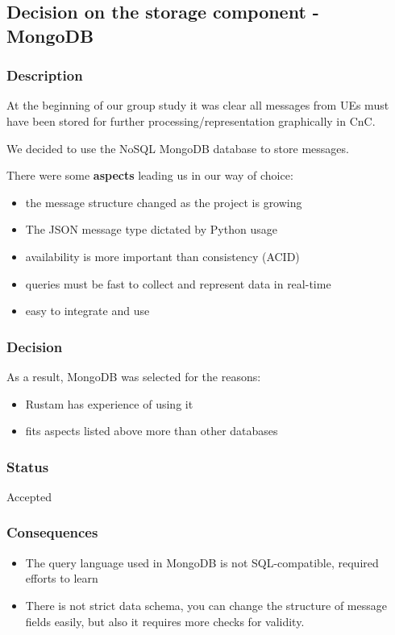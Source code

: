\subsection{Decision on the storage component -
MongoDB}\label{decision-on-the-storage-component---mongodb}

\subsubsection{Description}\label{description}

At the beginning of our group study it was clear all messages from UEs
must have been stored for further processing/representation graphically
in CnC.

We decided to use the NoSQL MongoDB database to store messages.

There were some \textbf{aspects} leading us in our way of choice:

\begin{itemize}
\tightlist
\item
  the message structure changed as the project is growing
\item
  The JSON message type dictated by Python usage
\item
  availability is more important than consistency (ACID)
\item
  queries must be fast to collect and represent data in real-time
\item
  easy to integrate and use
\end{itemize}

\subsubsection{Decision}\label{decision}

As a result, MongoDB was selected for the reasons:

\begin{itemize}
\tightlist
\item
  Rustam has experience of using it
\item
  fits aspects listed above more than other databases
\end{itemize}

\subsubsection{Status}\label{status}

Accepted

\subsubsection{Consequences}\label{consequences}

\begin{itemize}
\tightlist
\item
  The query language used in MongoDB is not SQL-compatible, required
  efforts to learn
\item
  There is not strict data schema, you can change the structure of
  message fields easily, but also it requires more checks for validity.
\end{itemize}